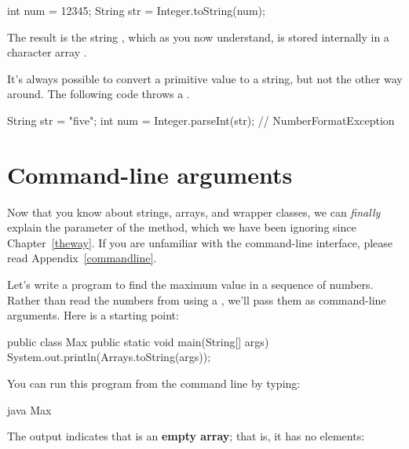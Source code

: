 \begin{code}
int num = 12345;
String str = Integer.toString(num);
\end{code}

The result is the string , which as you now understand, is stored internally in a character array .


It's always possible to convert a primitive value to a string, but not the other way around.
The following code throws a .

\begin{code}
String str = "five";
int num = Integer.parseInt(str);  // NumberFormatException
\end{code}


\section{Command-line arguments}


Now that you know about strings, arrays, and wrapper classes, we can {\em finally} explain the  parameter of the  method, which we have been ignoring since Chapter~\ref{theway}.
If you are unfamiliar with the command-line interface, please read Appendix~\ref{commandline}.

Let's write a program to find the maximum value in a sequence of numbers.
Rather than read the numbers from  using a , we'll pass them as command-line arguments.
Here is a starting point:

\begin{code}
public class Max {
    public static void main(String[] args) {
        System.out.println(Arrays.toString(args));
    }
}
\end{code}

You can run this program from the command line by typing:

\begin{stdout}
java Max
\end{stdout}


The output indicates that  is an {\bf empty array}; that is, it has no elements:

\begin{stdout}
[]
\end{stdout}

